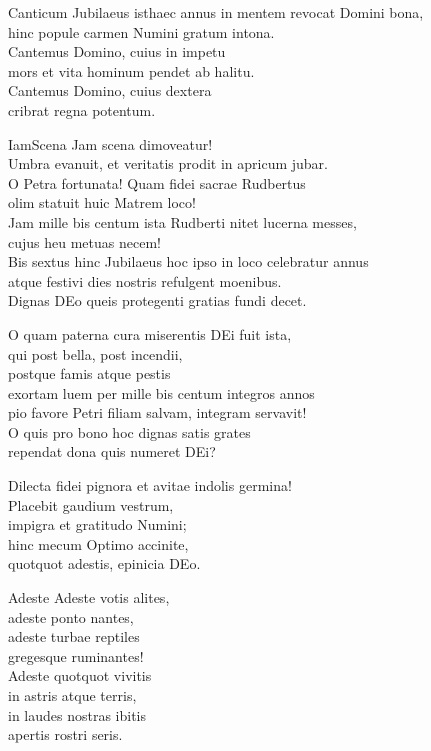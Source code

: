 \documentclass[tocstyle=ref-genre]{ees}
\begin{document}
{\begin{movement}{Canticum}
  \voice[Coro]
  Jubilaeus isthaec annus in mentem revocat Domini bona,\\
  hinc popule carmen Numini gratum intona.\\
  Cantemus Domino, cuius in impetu\\
  mors et vita hominum pendet ab halitu.\\
  Cantemus Domino, cuius dextera\\
  cribrat regna potentum.
\end{movement}

\begin{movement}{IamScena}
  Jam scena dimoveatur!\\
  Umbra evanuit, et veritatis prodit in apricum jubar.\\
  O Petra fortunata! Quam fidei sacrae Rudbertus\\
  olim statuit huic Matrem loco!\\
  Jam mille bis centum ista Rudberti nitet lucerna messes,\\
  cujus heu metuas necem!\\
  Bis sextus hinc Jubilaeus hoc ipso in loco celebratur annus\\
  atque festivi dies nostris refulgent moenibus.\\
  Dignas DEo queis protegenti gratias fundi decet.

  O quam paterna cura miserentis DEi fuit ista,\\
  qui post bella, post incendii,\\
  postque famis atque pestis\\
  exortam luem per mille bis centum integros annos\\
  pio favore Petri filiam salvam, integram servavit!\\
  O quis pro bono hoc dignas satis grates\\
  rependat dona quis numeret DEi?

  Dilecta fidei pignora et avitae indolis germina!\\
  Placebit gaudium vestrum,\\
  impigra et gratitudo Numini;\\
  hinc mecum Optimo accinite,\\
  quotquot adestis, epinicia DEo.
\end{movement}

\begin{movement}{Adeste}
  Adeste votis alites,\\
  adeste ponto nantes,\\
  adeste turbae reptiles\\
  gregesque ruminantes!\\
  Adeste quotquot vivitis\\
  in astris atque terris,\\
  in laudes nostras ibitis\\
  apertis rostri seris.
\end{movement}

}
\end{document}
